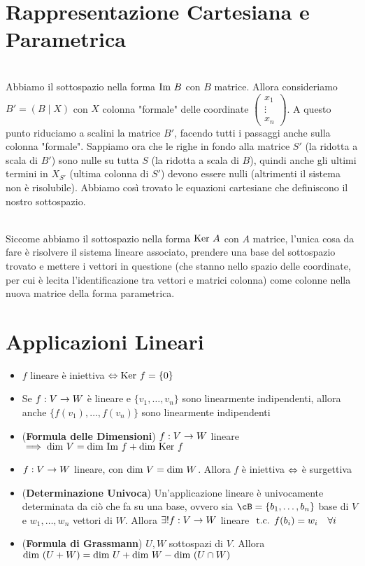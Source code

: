 \documentclass[a4paper,NoNotes,GeneralMath]{stdmdoc}
\begin{document}
	\section*{Rappresentazione Cartesiana e Parametrica}
	 \\
	Abbiamo il sottospazio nella forma $\mbox{Im } B$ con $B$ matrice. Allora consideriamo $B' = \left( B \mid X \right)$ con $X$ colonna "formale" delle coordinate $\left( \begin{array}{c} x_1 \\ \vdots \\ x_n \end{array} \right)$. A questo punto riduciamo a scalini la matrice $B'$, facendo tutti i passaggi anche sulla colonna "formale". Sappiamo ora che le righe in fondo alla matrice $S'$ (la ridotta a scala di $B'$) sono nulle su tutta $S$ (la ridotta a scala di $B$), quindi anche gli ultimi termini in $X_{S'}$ (ultima colonna di $S'$) devono essere nulli (altrimenti il sistema non è risolubile). Abbiamo così trovato le equazioni cartesiane che definiscono il nostro sottospazio.

	 \\
	Siccome abbiamo il sottospazio nella forma $\mbox{Ker } A$ con $A$ matrice, l'unica cosa da fare è risolvere il sistema lineare associato, prendere una base del sottospazio trovato e mettere i vettori in questione (che stanno nello spazio delle coordinate, per cui è lecita l'identificazione tra vettori e matrici colonna) come colonne nella nuova matrice della forma parametrica.

	\section*{Applicazioni Lineari}
	\begin{itemize}
		\item $f$ lineare è iniettiva $\Leftrightarrow \mbox{Ker } f = \{0\}$
		\item Se $f: V \rightarrow W$ è lineare e $\{v_1, \ldots, v_n\}$ sono linearmente indipendenti, allora anche $\{f(v_1), \ldots, f(v_n)\}$ sono linearmente indipendenti
		\item ({\bf Formula delle Dimensioni}) $f: V \rightarrow W$ lineare $\implies \mbox{dim } V = \mbox{dim } \mbox{Im } f + \mbox{dim } \mbox{Ker } f$
		\item $f: V \rightarrow W$ lineare, con $\mbox{dim } V = \mbox{dim } W$. Allora $f$ è iniettiva $\Leftrightarrow$ è surgettiva
		\item ({\bf Determinazione Univoca}) Un'applicazione lineare è univocamente determinata da ciò che fa su una base, ovvero sia $\cB = \{b_1, \ldots, b_n\}$ base di $V$ e $w_1, \ldots, w_n$ vettori di $W$. Allora $\exists ! f:V \rightarrow W$ lineare $\mbox{ t.c. } f(b_i) = w_i \quad \forall i$
		\item ({\bf Formula di Grassmann}) $U, W$ sottospazi di $V$. Allora $\mbox{dim } (U+W) = \mbox{dim } U + \mbox{dim } W - \mbox{dim } (U\cap W)$
	\end{itemize}
\end{document}
